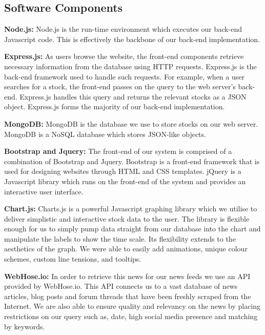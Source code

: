 \documentclass[11pt]{article}
\numberwithin{figure}{section}
\begin{document}
    \subsection{Software Components}
        {\bfseries Node.js:} Node.js is the run-time environment which executes our back-end Javascript code. This is effectively the backbone of our back-end implementation.
     
        \bigskip
        \noindent
        {\bfseries Express.js:} As users browse the website, the front-end components retrieve necessary information from the database using HTTP requests. Express.js is the back-end framework used to handle such requests. For example, when a user searches for a stock, the front-end passes on the query to the web server's back-end. Express.js handles this query and returns the relevant stocks as a JSON object. Express.js forms the majority of our back-end implementation.
       
        \bigskip
        \noindent
        {\bfseries MongoDB:} MongoDB is the database we use to store stocks on our web server. MongoDB is a NoSQL database which stores JSON-like objects.
        
        \bigskip
        \noindent
        {\bfseries Bootstrap and Jquery:} The front-end of our system is comprised of a combination of Bootstrap and Jquery. Bootstrap is a front-end framework that is used for designing websites through HTML and CSS templates. jQuery is a Javascript library which runs on the front-end of the system and provides an interactive user interface.
   
        \bigskip
        \noindent
        {\bfseries Chart.js:} Charts.js is a powerful Javascript graphing library which we utilise to deliver simplistic and interactive stock data to the user. The library is flexible enough for us to simply pump data straight from our database into the chart and manipulate the labels to show the time scale. Its flexibility extends to the aesthetics of the graph. We were able to easily add animations, unique colour schemes, custom line tensions, and tooltips.
        
        \bigskip
        \noindent
        {\bfseries WebHose.io:} In order to retrieve this news for our news feeds we use an API provided by WebHose.io. This API connects us to a vast database of news articles, blog posts and forum threads that have been freshly scraped from the Internet. We are also able to ensure quality and relevancy on the news by placing restrictions on our query such as, date, high social media presence and matching by keywords. 
        
\end{document}
